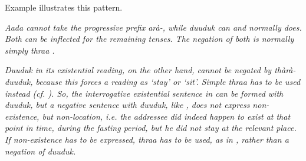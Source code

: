 
Example  illustrates this pattern.





\em Aada \em cannot take the progressive prefix \em arà-\em, while \em duuduk \em can and normally does. Both can be inflected for the remaining tenses. The negation of both is normally simply \em thraa \em {}.








\em Duuduk \em in its existential reading, on the other hand, cannot be negated by \em thàrà-duuduk\em, because this forces a reading as `stay' or  `sit'. Simple \em thraa \em has to be used instead (cf. ). So, the interrogative existential sentence in  can be formed with \em duuduk\em, but a negative sentence with \em duuduk\em, like , does not express non-existence, but non-location, i.e. the addressee did indeed happen to exist at that point in time, during the fasting period, but he did not stay at the relevant place. If non-existence has to be expressed, \em thraa \em has to be used, as in , rather than a negation of \em duuduk\em.

